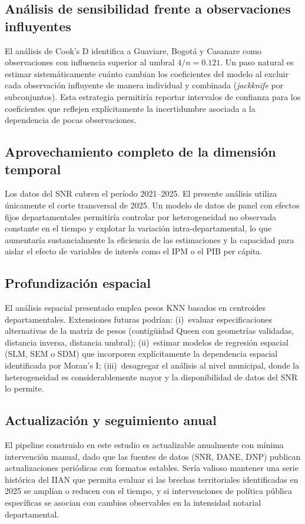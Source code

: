 \documentclass{article}
\begin{document}
\subsection{Análisis de sensibilidad frente a observaciones influyentes}

El análisis de Cook's D identifica a Guaviare, Bogotá y Casanare
como observaciones con influencia superior al umbral $4/n = 0.121$.
Un paso natural es estimar sistemáticamente cuánto cambian los
coeficientes del modelo al excluir cada observación influyente de
manera individual y combinada (\textit{jackknife} por subconjuntos).
Esta estrategia permitiría reportar intervalos de confianza para los
coeficientes que reflejen explícitamente la incertidumbre asociada
a la dependencia de pocas observaciones.

\subsection{Aprovechamiento completo de la dimensión temporal}

Los datos del SNR cubren el período 2021--2025. El presente análisis
utiliza únicamente el corte transversal de 2025. Un modelo de datos
de panel con efectos fijos departamentales permitiría controlar por
heterogeneidad no observada constante en el tiempo y explotar la
variación intra-departamental, lo que aumentaría sustancialmente la
eficiencia de las estimaciones y la capacidad para aislar el efecto
de variables de interés como el IPM o el PIB per cápita.

\subsection{Profundización espacial}

El análisis espacial presentado emplea pesos KNN basados en centroides
departamentales. Extensiones futuras podrían: (i)~evaluar
especificaciones alternativas de la matriz de pesos (contigüidad
Queen con geometrías validadas, distancia inversa, distancia umbral);
(ii)~estimar modelos de regresión espacial (SLM, SEM o SDM) que
incorporen explícitamente la dependencia espacial identificada por
Moran's I; (iii)~desagregar el análisis al nivel municipal, donde la
heterogeneidad es considerablemente mayor y la disponibilidad de datos
del SNR lo permite.

\subsection{Actualización y seguimiento anual}

El pipeline construido en este estudio es actualizable anualmente con
mínima intervención manual, dado que las fuentes de datos (SNR,
DANE, DNP) publican actualizaciones periódicas con formatos estables.
Sería valioso mantener una serie histórica del IIAN que permita
evaluar si las brechas territoriales identificadas en 2025 se amplían
o reducen con el tiempo, y si intervenciones de política pública
específicas se asocian con cambios observables en la intensidad
notarial departamental.
\end{document}

